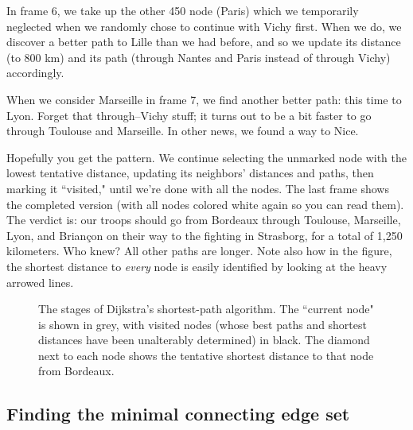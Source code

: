 In frame 6, we take up the other 450 node (Paris) which we temporarily
neglected when we randomly chose to continue with Vichy first. When we do,
we discover a better path to Lille than we had before, and so we update its
distance (to 800 km) and its path (through Nantes and Paris instead of
through Vichy) accordingly.

When we consider Marseille in frame 7, we find another better path: this
time to Lyon. Forget that through--Vichy stuff; it turns out to be a bit
faster to go through Toulouse and Marseille. In other news, we found a way
to Nice.

Hopefully you get the pattern. We continue selecting the unmarked node with
the lowest tentative distance, updating its neighbors' distances and paths,
then marking it ``visited," until we're done with all the nodes. The last
frame shows the completed version (with all nodes colored white again so
you can read them). The verdict is: our troops should go from Bordeaux
through Toulouse, Marseille, Lyon, and Brian\c{c}on on their way to the
fighting in Strasborg, for a total of 1,250 kilometers. Who knew? All other
paths are longer. Note also how in the figure, the shortest distance to
\textit{every} node is easily identified by looking at the heavy arrowed
lines.


\begin{figure}[ht]
\centering
\begin{custommargins}{-2.4cm}{-2.8cm}

\caption{The stages of Dijkstra's shortest-path algorithm. The ``current
node" is shown in grey, with visited nodes (whose best paths and shortest
distances have been unalterably determined) in black. The diamond next to
each node shows the tentative shortest distance to that node from
Bordeaux.}
\label{fig:dijkstra}
\end{custommargins}
\end{figure}

\subsection{Finding the minimal connecting edge set}

